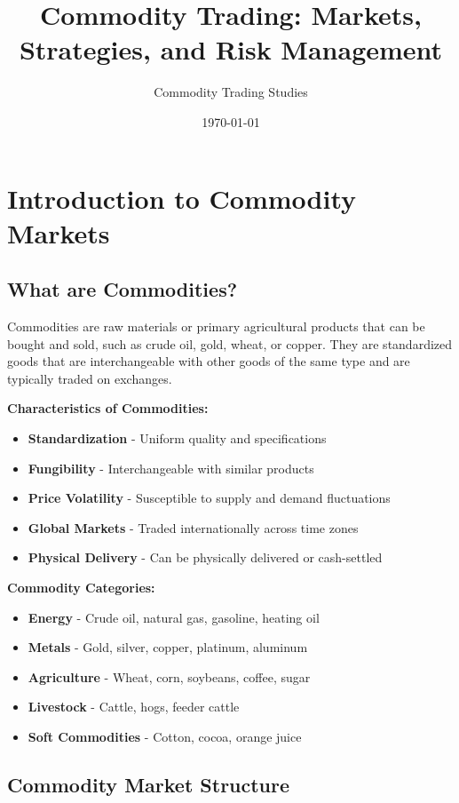 \documentclass[12pt]{article}
\title{Commodity Trading: Markets, Strategies, and Risk Management}
\author{Commodity Trading Studies}
\date{\today}
\begin{document}
\maketitle

\section{Introduction to Commodity Markets}

\subsection{What are Commodities?}
Commodities are raw materials or primary agricultural products that can be bought and sold, such as crude oil, gold, wheat, or copper. They are standardized goods that are interchangeable with other goods of the same type and are typically traded on exchanges.

\textbf{Characteristics of Commodities:}
\begin{itemize}
    \item \textbf{Standardization} - Uniform quality and specifications
    \item \textbf{Fungibility} - Interchangeable with similar products
    \item \textbf{Price Volatility} - Susceptible to supply and demand fluctuations
    \item \textbf{Global Markets} - Traded internationally across time zones
    \item \textbf{Physical Delivery} - Can be physically delivered or cash-settled
\end{itemize}

\textbf{Commodity Categories:}
\begin{itemize}
    \item \textbf{Energy} - Crude oil, natural gas, gasoline, heating oil
    \item \textbf{Metals} - Gold, silver, copper, platinum, aluminum
    \item \textbf{Agriculture} - Wheat, corn, soybeans, coffee, sugar
    \item \textbf{Livestock} - Cattle, hogs, feeder cattle
    \item \textbf{Soft Commodities} - Cotton, cocoa, orange juice
\end{itemize}

\subsection{Commodity Market Structure}
\end{document}
